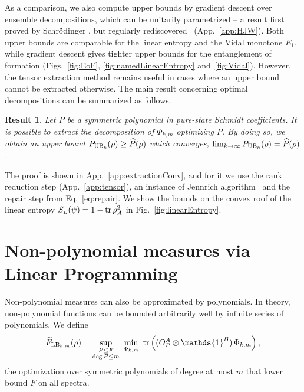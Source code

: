 \documentclass[aps,pra,twocolumn,showpacs,superscriptaddress,groupedaddress]{revtex4-2}
\newcommand{\one}[0]{\mathds{1}}
\newcommand{\I}{\one}
\newtheorem{result}    [theorem]{Result}
\begin{document}
As a comparison, we also compute upper bounds by gradient descent over ensemble decompositions, which can be unitarily parametrized -- 
a result first proved by Schrödinger \cite{schrodinger36}, but regularly rediscovered~\cite{jaynes57, gisin89, HJW,  kirkpatrick06} (App.~\ref{app:HJW}). Both upper bounds are comparable for the linear entropy and the Vidal monotone $E_1$, while gradient descent gives tighter upper bounds for the entanglement of formation (Figs.~\ref{fig:EoF}, \ref{fig:namedLinearEntropy} and~\ref{fig:Vidal}). However, the tensor extraction method remains useful in cases where an upper bound cannot be extracted otherwise. The main result concerning optimal decompositions can be summarized as follows.

\begin{result}
    Let $P$ be a symmetric polynomial in pure-state Schmidt coefficients.
    It is possible to extract the decomposition of $\Phi_{k,m}$ optimizing $P$. By doing so, we obtain an upper bound $P_{{\rm UB}_k}(\rho)\geq \widehat{P}(\rho)$ which converges, $\lim_{k\rightarrow\infty}P_{{\rm UB}_k}(\rho)=\widehat{P}(\rho)$.
\end{result}\label{thm:extraction}

The proof is shown in App.~\ref{app:extractionConv}, and for it we use the rank reduction step (App.~\ref{app:tensor}), an instance of Jennrich algorithm~\cite{Harshman1970,Leurgans1993} and the repair step from Eq.~\eqref{eq:repair}. We show the bounds on the convex roof of the linear entropy $S_L(\psi)=1-\tr\rho_A^2$ in Fig.~\ref{fig:linearEntropy}.



\section{Non-polynomial measures via Linear Programming}\label{sec:LP}

Non-polynomial measures can also be approximated by polynomials.
In theory, non-polynomial functions can be bounded arbitrarily well by infinite series of polynomials. We define
\begin{equation}\label{eq:FLBexact}
    \widetilde{F}_{{\rm LB}_{k,m}}(\rho)=\sup_{\substack{P\leq F\\ \deg P\leq m}}\ \min_{\Phi_{k,m}}\ \tr\left((O_P^A\otimes\I^B)\,\Phi_{k,m}\right),
\end{equation}
the optimization over symmetric polynomials of degree at most $m$ that lower bound $F$ on all spectra.
\end{document}
